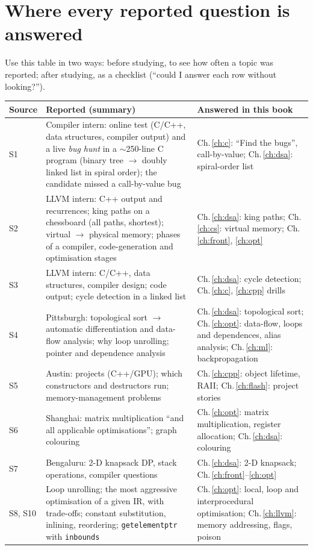 \documentclass[10pt,a4paper,openany,oneside]{report}
\newcommand{\prio}[1]{\texorpdfstring{\ifcase#1\or{\color{gold}\ding{72}}\or{\color{gold}\ding{72}\ding{72}}\or{\color{gold}\ding{72}\ding{72}\ding{72}}\fi}{}}
\begin{document}
\section{Where every reported question is answered \prio{3}}
Use this table in two ways: before studying, to see how often a topic was reported; after studying, as a checklist (``could I answer each row without looking?'').
\begin{center}\small
\begin{xltabular}{\textwidth}{@{}L{1.2cm}Y L{5.1cm}@{}}
\toprule
\textbf{Source} & \textbf{Reported (summary)} & \textbf{Answered in this book}\\
\midrule\endhead
S1 & Compiler intern: online test (C/C++, data structures, compiler output) and a live \emph{bug hunt} in a $\sim$250-line C program (binary tree $\to$ doubly linked list in spiral order); the candidate missed a call-by-value bug & Ch.\,\ref{ch:c}: ``Find the bugs'', call-by-value; Ch.\,\ref{ch:dsa}: spiral-order list\\
S2 & LLVM intern: C++ output and recurrences; king paths on a chessboard (all paths, shortest); virtual $\to$ physical memory; phases of a compiler, code-generation and optimisation stages & Ch.\,\ref{ch:dsa}: king paths; Ch.\,\ref{ch:cs}: virtual memory; Ch.\,\ref{ch:front}, \ref{ch:opt}\\
S3 & LLVM intern: C/C++, data structures, compiler design; code output; cycle detection in a linked list & Ch.\,\ref{ch:dsa}: cycle detection; Ch.\,\ref{ch:c}, \ref{ch:cpp} drills\\
S4 & Pittsburgh: topological sort $\to$ automatic differentiation and data-flow analysis; why loop unrolling; pointer and dependence analysis & Ch.\,\ref{ch:dsa}: topological sort; Ch.\,\ref{ch:opt}: data-flow, loops and dependences, alias analysis; Ch.\,\ref{ch:ml}: backpropagation\\
S5 & Austin: projects (C++/GPU); which constructors and destructors run; memory-management problems & Ch.\,\ref{ch:cpp}: object lifetime, RAII; Ch.\,\ref{ch:flash}: project stories\\
S6 & Shanghai: matrix multiplication ``and all applicable optimisations''; graph colouring & Ch.\,\ref{ch:opt}: matrix multiplication, register allocation; Ch.\,\ref{ch:dsa}: colouring\\
S7 & Bengaluru: 2-D knapsack DP, stack operations, compiler questions & Ch.\,\ref{ch:dsa}: 2-D knapsack; Ch.\,\ref{ch:front}--\ref{ch:opt}\\
S8, S10 & Loop unrolling; the most aggressive optimisation of a given IR, with trade-offs; constant substitution, inlining, reordering; \texttt{getelementptr} with \texttt{inbounds} & Ch.\,\ref{ch:opt}: local, loop and interprocedural optimisation; Ch.\,\ref{ch:llvm}: memory addressing, flags, poison\\

\end{xltabular}
\end{center}
\end{document}
